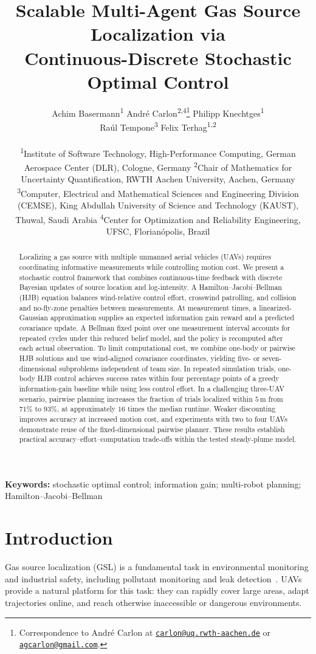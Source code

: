 \documentclass{article}
\title{Scalable Multi-Agent Gas Source Localization via\\
       Continuous-Discrete Stochastic Optimal Control}
\author{
  Achim Basermann\textsuperscript{1}\quad
  André Carlon\textsuperscript{2,4}\thanks{Correspondence to André Carlon at
    \href{mailto:carlon@uq.rwth-aachen.de}{\nolinkurl{carlon@uq.rwth-aachen.de}} or
    \href{mailto:agcarlon@gmail.com}{\nolinkurl{agcarlon@gmail.com}}.}\quad
  Philipp Knechtges\textsuperscript{1}\\[0.2em]
  Raúl Tempone\textsuperscript{3}\quad
  Felix Terhag\textsuperscript{1,2}\\[0.6em]
  \parbox{0.95\textwidth}{\centering\small
    \textsuperscript{1}Institute of Software Technology, High-Performance Computing,
    German Aerospace Center (DLR), Cologne, Germany\endgraf
    \textsuperscript{2}Chair of Mathematics for Uncertainty Quantification,
    RWTH Aachen University, Aachen, Germany
    \textsuperscript{3}Computer, Electrical and Mathematical Sciences and Engineering Division (CEMSE),
    King Abdullah University of Science and Technology (KAUST), Thuwal, Saudi Arabia\endgraf
    \textsuperscript{4}Center for Optimization and Reliability Engineering,
    UFSC, Florianópolis, Brazil\endgraf
  }
}
\date{}
\begin{document}
\maketitle


\begin{abstract}
Localizing a gas source with multiple unmanned aerial vehicles (UAVs) requires coordinating informative measurements while controlling motion cost.
We present a stochastic control framework that combines continuous-time feedback with discrete Bayesian updates of source location and log-intensity.
A Hamilton--Jacobi--Bellman (HJB) equation balances wind-relative control effort, crosswind patrolling, and collision and no-fly-zone penalties between measurements.
At measurement times, a linearized-Gaussian approximation supplies an expected information gain reward and a predicted covariance update.
A Bellman fixed point over one measurement interval accounts for repeated cycles under this reduced belief model, and the policy is recomputed after each actual observation.
To limit computational cost, we combine one-body or pairwise HJB solutions and use wind-aligned covariance coordinates, yielding five- or seven-dimensional subproblems independent of team size.
In repeated simulation trials, one-body HJB control achieves success rates within four percentage points of a greedy information-gain baseline while using less control effort.
In a challenging three-UAV scenario, pairwise planning increases the fraction of trials localized within $5\,\mathrm{m}$ from $71\%$ to $93\%$, at approximately $16$ times the median runtime.
Weaker discounting improves accuracy at increased motion cost, and experiments with two to four UAVs demonstrate reuse of the fixed-dimensional pairwise planner.
These results establish practical accuracy--effort--computation trade-offs within the tested steady-plume model.
\end{abstract}

\noindent\textbf{Keywords:} stochastic optimal control; information gain; multi-robot planning; Hamilton--Jacobi--Bellman

\section{Introduction}
\label{sec:introduction}
Gas source localization (GSL) is a fundamental task in environmental monitoring and industrial safety, including pollutant monitoring and leak detection~\cite{francis2022gslReview}.
UAVs provide a natural platform for this task: they can rapidly cover large areas, adapt trajectories online, and reach otherwise inaccessible or dangerous environments.
\end{document}

